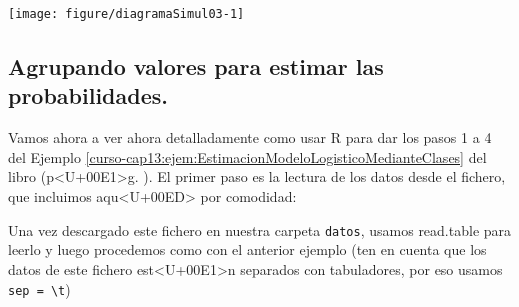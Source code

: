 \documentclass[10pt,a4paper]{article}
\begin{document}
\begin{knitrout}
\color{fgcolor}\begin{kframe}
\begin{alltt}
\hlstd{(}\hlstd{)}
 \hlkwb{=} \hlstd{(}\hlopt{:}\hlstd{,}  \hlstd{=}   \hlstd{=} \hlstd{)}
 \hlkwb{=}   
 \hlkwb{=} \hlstd{()}
\hlstd{colores[datosSimul03}\hlopt{$} \hlopt{==} \hlstd{]} \hlkwb{=} 
\hlstd{colores[datosSimul03}\hlopt{$} \hlopt{==} \hlstd{]} \hlkwb{=} 
\hlopt{$}\hlopt{$}  \hlstd{=} \hlstd{,}   \hlstd{=}\hlstd{,}\hlstd{=}\hlstd{,}
      \hlstd{=} \hlstd{,}  \hlstd{=} \hlstd{,} \hlstd{=}\hlstd{, )}
\hlstd{(}\hlstd{,} \hlstd{(}\hlstd{,} \hlstd{),}  \hlstd{=} \hlstd{,}  \hlstd{=}  \hlstd{(}\hlstd{,} \hlstd{))}
\hlstd{(}\hlstd{=}\hlstd{)}
\end{alltt}
\end{kframe}

{\centering \texttt{[image: figure/diagramaSimul03-1]} 

}



\end{knitrout}

\subsection{Agrupando valores para estimar las probabilidades.}
\label{tut13:subsec:ConstruccionDetalladaModelo}

 Vamos ahora a ver ahora detalladamente como usar R para dar los pasos 1 a 4 del Ejemplo \ref{curso-cap13:ejem:EstimacionModeloLogisticoMedianteClases} del libro (p<U+00E1>g. \pageref{curso-cap13:ejem:EstimacionModeloLogisticoMedianteClases}). El primer paso es la lectura de los datos desde el fichero, que incluimos aqu<U+00ED> por comodidad:
\begin{center}
\end{center}
Una vez descargado este fichero en nuestra carpeta {\tt datos},  usamos read.table para leerlo y luego procedemos como con el anterior ejemplo (ten en cuenta que los datos de este fichero est<U+00E1>n separados con tabuladores, por eso usamos \verb# sep = \t#)
\end{document}
